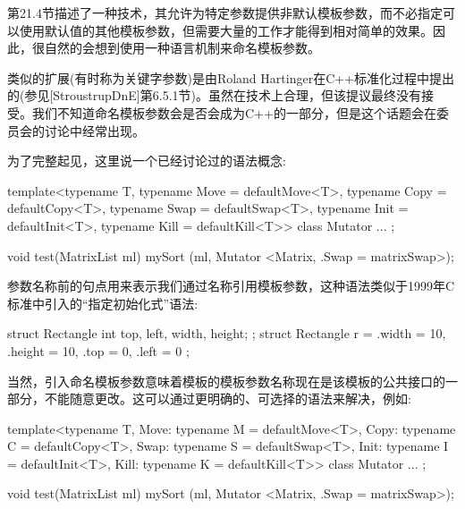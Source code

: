 第21.4节描述了一种技术，其允许为特定参数提供非默认模板参数，而不必指定可以使用默认值的其他模板参数，但需要大量的工作才能得到相对简单的效果。因此，很自然的会想到使用一种语言机制来命名模板参数。

类似的扩展(有时称为关键字参数)是由Roland Hartinger在C++标准化过程中提出的(参见[StroustrupDnE]第6.5.1节)。虽然在技术上合理，但该提议最终没有接受。我们不知道命名模板参数会是否会成为C++的一部分，但是这个话题会在委员会的讨论中经常出现。

为了完整起见，这里说一个已经讨论过的语法概念:

\begin{cpp}
template<typename T,
	typename Move = defaultMove<T>,
	typename Copy = defaultCopy<T>,
	typename Swap = defaultSwap<T>,
	typename Init = defaultInit<T>,
	typename Kill = defaultKill<T>>
class Mutator {
	...
};

void test(MatrixList ml)
{
	mySort (ml, Mutator <Matrix, .Swap = matrixSwap>);
}
\end{cpp}

参数名称前的句点用来表示我们通过名称引用模板参数，这种语法类似于1999年C标准中引入的“指定初始化式”语法:

\begin{cpp}
struct Rectangle { int top, left, width, height; };
struct Rectangle r = { .width = 10, .height = 10, .top = 0, .left = 0 };
\end{cpp}

当然，引入命名模板参数意味着模板的模板参数名称现在是该模板的公共接口的一部分，不能随意更改。这可以通过更明确的、可选择的语法来解决，例如:

\begin{cpp}
template<typename T,
	Move: typename M = defaultMove<T>,
	Copy: typename C = defaultCopy<T>,
	Swap: typename S = defaultSwap<T>,
	Init: typename I = defaultInit<T>,
	Kill: typename K = defaultKill<T>>
class Mutator {
	...
};

void test(MatrixList ml)
{
	mySort (ml, Mutator <Matrix, .Swap = matrixSwap>);
}
\end{cpp}









































